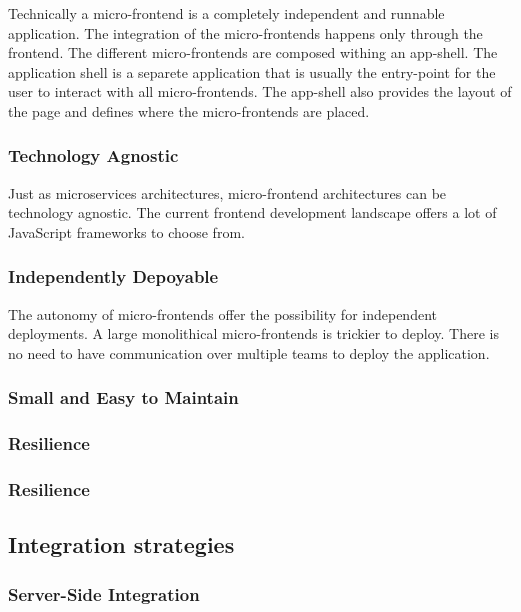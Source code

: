 Technically a micro-frontend is a completely independent and runnable application.
The integration of the micro-frontends happens only through the frontend. The different micro-frontends are composed withing an app-shell. The application shell is a separete application that is usually the entry-point for the user to interact with all micro-frontends. The app-shell also provides the layout of the page and defines where the micro-frontends are placed.

\subsubsection{Technology Agnostic}

Just as microservices architectures, micro-frontend architectures can be technology agnostic. The current frontend development landscape offers a lot of JavaScript frameworks to choose from.

\subsubsection{Independently Depoyable}

The autonomy of micro-frontends offer the possibility for independent deployments. A large monolithical micro-frontends is trickier to deploy. There is no need to have communication over multiple teams to deploy the application.


\subsubsection{Small and Easy to Maintain}



\subsubsection{Resilience}



\subsubsection{Resilience}



\subsection{Integration strategies}

\subsubsection{Server-Side Integration}
